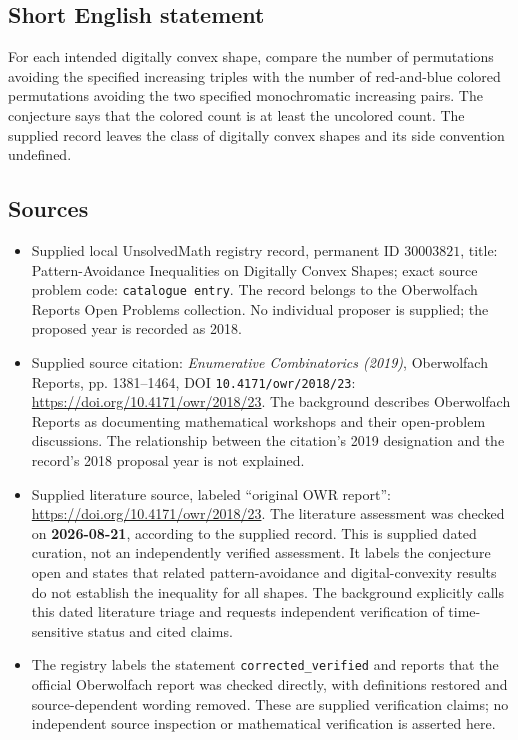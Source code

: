 \documentclass[11pt]{article}
\begin{document}
\subsection{Short English statement}
For each intended digitally convex shape, compare the number of permutations avoiding the specified increasing triples with the number of red-and-blue colored permutations avoiding the two specified monochromatic increasing pairs. The conjecture says that the colored count is at least the uncolored count. The supplied record leaves the class of digitally convex shapes and its side convention undefined.
\subsection{Sources}
\begin{itemize}
\item Supplied local UnsolvedMath registry record, permanent ID \(30003821\), title: Pattern-Avoidance Inequalities on Digitally Convex Shapes; exact source problem code: \texttt{catalogue entry}. The record belongs to the Oberwolfach Reports Open Problems collection. No individual proposer is supplied; the proposed year is recorded as 2018.
\item Supplied source citation: \emph{Enumerative Combinatorics (2019)}, Oberwolfach Reports, pp. 1381--1464, DOI \texttt{10.4171/owr/2018/23}: \url{https://doi.org/10.4171/owr/2018/23}. The background describes Oberwolfach Reports as documenting mathematical workshops and their open-problem discussions. The relationship between the citation's 2019 designation and the record's 2018 proposal year is not explained.
\item Supplied literature source, labeled ``original OWR report'': \url{https://doi.org/10.4171/owr/2018/23}. The literature assessment was checked on \textbf{2026-08-21}, according to the supplied record. This is supplied dated curation, not an independently verified assessment. It labels the conjecture open and states that related pattern-avoidance and digital-convexity results do not establish the inequality for all shapes. The background explicitly calls this dated literature triage and requests independent verification of time-sensitive status and cited claims.
\item The registry labels the statement \texttt{corrected\_verified} and reports that the official Oberwolfach report was checked directly, with definitions restored and source-dependent wording removed. These are supplied verification claims; no independent source inspection or mathematical verification is asserted here.
\end{itemize}
\end{document}
